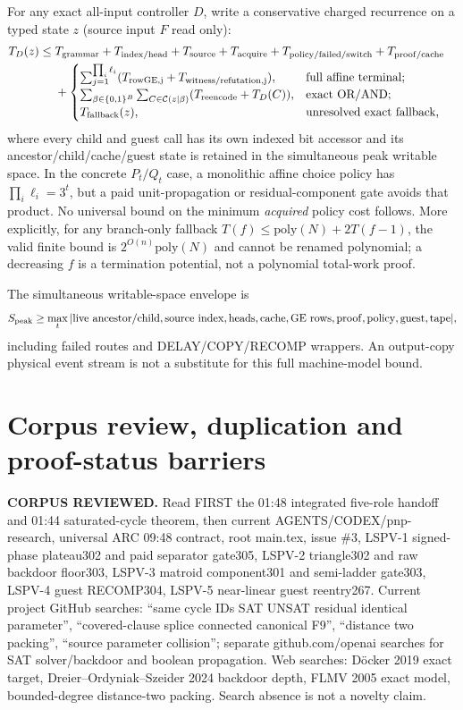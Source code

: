 \documentclass[11pt]{article}
\begin{document}
For any exact all-input controller $D$, write a conservative charged recurrence on a typed state $z$ (source input $F$ read only):
\[
\begin{split}
T_D(z)\le {}&T_{\rm grammar}+T_{\rm index/head}+T_{\rm source}+T_{\rm acquire}
 +T_{\rm policy/failed/switch}+T_{\rm proof/cache}\quad\\
&+\begin{cases}
\sum_{j=1}^{\prod_i\ell_i}(T_{\rm rowGE,j}+T_{\rm witness/refutation,j}),&\text{full affine terminal};\\
\sum_{\beta\in\{0,1\}^B}\sum_{C\in\mathcal C(z\mid\beta)}(T_{\rm reencode}+T_D(C)),&\text{exact OR/AND};\\
T_{\rm fallback}(z),&\text{unresolved exact fallback},
\end{cases}
\end{split}
\]
where every child and guest call has its own indexed bit accessor and its ancestor/child/cache/guest state is retained in the simultaneous peak writable space. In the concrete $P_t/Q_t$ case, a monolithic affine choice policy has $\prod_i\ell_i=3^t$, but a paid unit-propagation or residual-component gate avoids that product. No universal bound on the minimum \emph{acquired} policy cost follows. More explicitly, for any branch-only fallback $T(f)\le \mathrm{poly}(N)+2T(f-1)$, the valid finite bound is $2^{O(n)}\mathrm{poly}(N)$ and cannot be renamed polynomial; a decreasing $f$ is a termination potential, not a polynomial total-work proof.

The simultaneous writable-space envelope is
\[
S_{\rm peak}\ge \max_t |\mathrm{live\ ancestor/child,source\ index,heads,cache,GE\ rows,proof,policy,guest,tape}|,
\]
including failed routes and DELAY/COPY/RECOMP wrappers. An output-copy physical event stream is not a substitute for this full machine-model bound.

\section{Corpus review, duplication and proof-status barriers}
\noindent\textbf{CORPUS REVIEWED.} Read FIRST the 01:48 integrated five-role handoff and 01:44 saturated-cycle theorem, then current AGENTS/CODEX/pnp-research, universal ARC 09:48 contract, root main.tex, issue \#3, LSPV-1 signed-phase plateau302 and paid separator gate305, LSPV-2 triangle302 and raw backdoor floor303, LSPV-3 matroid component301 and semi-ladder gate303, LSPV-4 guest RECOMP304, LSPV-5 near-linear guest reentry267. Current project GitHub searches: ``same cycle IDs SAT UNSAT residual identical parameter'', ``covered-clause splice connected canonical F9'', ``distance two packing'', ``source parameter collision''; separate github.com/openai searches for SAT solver/backdoor and boolean propagation. Web searches: D\"ocker 2019 exact target, Dreier--Ordyniak--Szeider 2024 backdoor depth, FLMV 2005 exact model, bounded-degree distance-two packing. Search absence is not a novelty claim.
\end{document}

